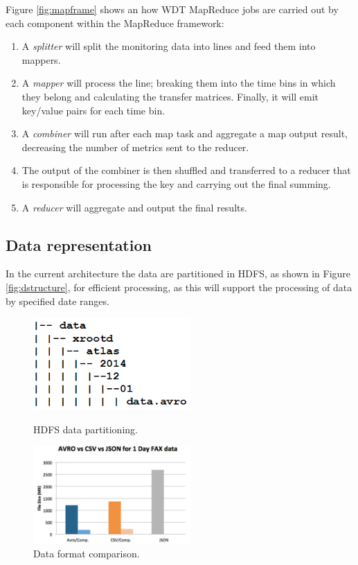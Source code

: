 \vspace{5mm}

Figure \ref{fig:mapframe} shows an how WDT MapReduce jobs are carried out by each component within the MapReduce framework: 

\begin{enumerate}
 \item A \textit{splitter} will split the monitoring data into lines and feed them into mappers.
 \item A \textit{mapper} will process the line; breaking them into the time bins in which they belong and calculating the transfer matrices. %
Finally, it will emit key/value pairs for each time bin.
 \item A \textit{combiner} will run after each map task and aggregate a map output result, decreasing the number of metrics sent to the reducer.
 \item The output of the combiner is then shuffled and transferred to a reducer that is responsible for processing the key  and carrying out the final summing.
 \item A \textit{reducer} will aggregate and output the final results.
\end{enumerate}

\subsection{Data representation}
In the current architecture the data are partitioned in HDFS, as shown in Figure \ref{fig:dstructure}, for efficient processing, as this will support the processing of data by specified date ranges.

\begin{figure}[!htb]
\centering
\begin{minipage}{.5\textwidth}
\centering
\includegraphics[width=60mm]{./Figures/dstructure.png}
\caption{\small HDFS data partitioning.}\label{fig:dstructure}
\end{minipage}%
\begin{minipage}{0.5\textwidth}
\centering
\includegraphics[width=60mm]{./Figures/format_plot.pdf}
\caption{\small Data format comparison.}\label{fig:format}
\end{minipage}
\end{figure}

